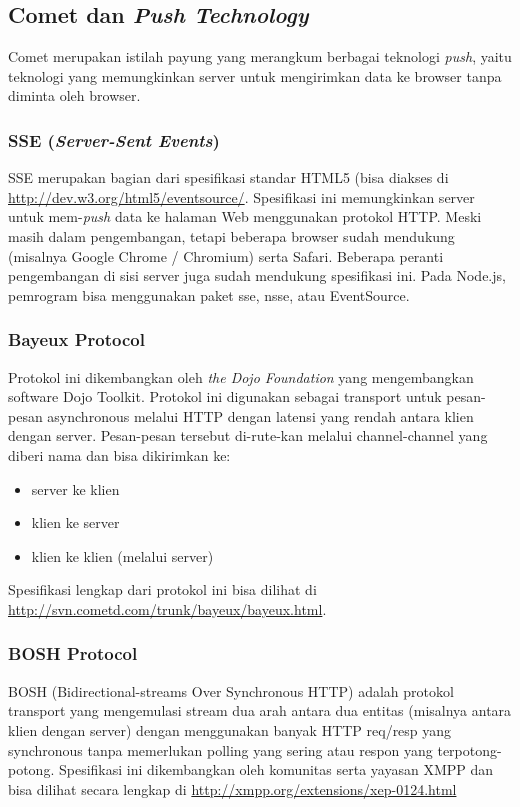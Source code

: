 \subsection{Comet dan \textit{Push Technology}}

Comet merupakan istilah payung yang merangkum berbagai teknologi \textit{push}, yaitu teknologi yang memungkinkan server untuk mengirimkan data ke browser tanpa diminta oleh browser.

\subsubsection{SSE (\textit{Server-Sent Events})}

SSE merupakan bagian dari spesifikasi standar HTML5 (bisa diakses di \url{http://dev.w3.org/html5/eventsource/}. Spesifikasi ini memungkinkan server untuk mem-\textit{push} data ke halaman Web menggunakan protokol HTTP. Meski masih dalam pengembangan, tetapi beberapa browser sudah mendukung (misalnya Google Chrome / Chromium) serta Safari. Beberapa peranti pengembangan di sisi server juga sudah mendukung spesifikasi ini. Pada Node.js, pemrogram bisa menggunakan paket sse, nsse, atau EventSource.

\subsubsection{Bayeux Protocol}

Protokol ini dikembangkan oleh \textit{the Dojo Foundation} yang mengembangkan software Dojo Toolkit. Protokol ini digunakan sebagai transport untuk pesan-pesan asynchronous melalui HTTP dengan latensi yang rendah antara klien dengan server. Pesan-pesan tersebut di-rute-kan melalui channel-channel yang diberi nama dan bisa dikirimkan ke:
\begin{itemize}
	\item server ke klien
	\item klien ke server
	\item klien ke klien (melalui server)
\end{itemize}

Spesifikasi lengkap dari protokol ini bisa dilihat di \url{http://svn.cometd.com/trunk/bayeux/bayeux.html}.

\subsubsection{BOSH Protocol}

BOSH (Bidirectional-streams Over Synchronous HTTP) adalah protokol transport yang mengemulasi stream dua arah antara dua entitas (misalnya antara klien dengan server) dengan menggunakan banyak HTTP req/resp yang synchronous tanpa memerlukan polling yang sering atau respon yang terpotong-potong. Spesifikasi ini dikembangkan oleh komunitas serta yayasan XMPP dan bisa dilihat secara lengkap di \url{http://xmpp.org/extensions/xep-0124.html}

